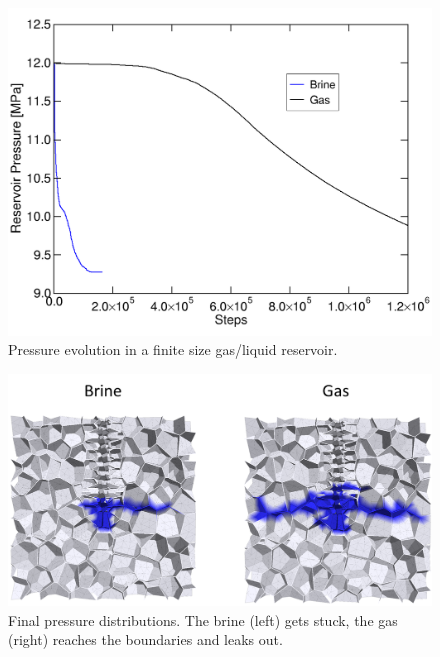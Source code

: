 \begin{figure}[!ht]
\centering
\includegraphics[width=1\textwidth]{figures/me4-3dec-comparison.png}
\caption{Pressure evolution in a finite size gas/liquid reservoir.}
\label{fig:ME4-3dec-comp}
\end{figure}

\begin{figure}[!ht]
\centering
\includegraphics[width=1\textwidth]{figures/me4-3dec-vertcuts.png}
\caption{Final pressure distributions. The brine (left) gets stuck, the gas (right) reaches the boundaries and leaks out.}
\label{fig:ME4-3dec-vertcuts}
\end{figure}

